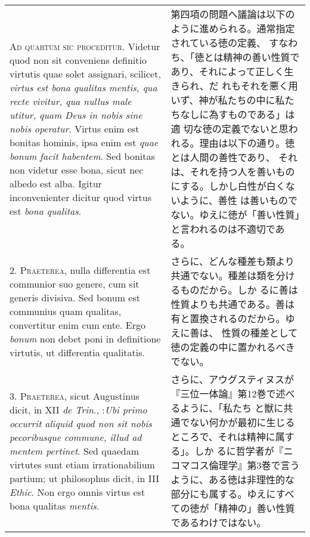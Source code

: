 \documentclass[10pt]{jsarticle}
\begin{document}
\begin{longtable}{p{21em}p{21em}}
{\scshape Ad quartum sic proceditur}. Videtur quod non sit conveniens
definitio virtutis quae solet assignari, scilicet, {\itshape virtus
est bona qualitas mentis, qua recte vivitur, qua nullus male utitur,
quam Deus in nobis sine nobis operatur}. Virtus enim est bonitas
hominis, ipsa enim est {\itshape quae bonum facit habentem}. Sed
bonitas non videtur esse bona, sicut nec albedo est alba. Igitur
inconvenienter dicitur quod virtus est {\itshape bona qualitas}.

&

第四項の問題へ議論は以下のように進められる。通常指定されている徳の定義、
すなわち、「徳とは精神の善い性質であり、それによって正しく生きられ、だ
れもそれを悪く用いず、神が私たちの中に私たちなしに為すものである」は適
切な徳の定義でないと思われる。理由は以下の通り。徳とは人間の善性であり、
それは、それを持つ人を善いものにする。しかし白性が白くないように、善性
は善いものでない。ゆえに徳が「善い性質」と言われるのは不適切である。



\\



2. {\scshape Praeterea}, nulla differentia est communior suo genere,
cum sit generis divisiva. Sed bonum est communius quam qualitas,
convertitur enim cum ente. Ergo {\itshape bonum} non debet poni in
definitione virtutis, ut differentia qualitatis.


&

さらに、どんな種差も類より共通でない。種差は類を分けるものだから。しか
るに善は性質よりも共通である。善は有と置換されるのだから。ゆえに善は、
性質の種差として徳の定義の中に置かれるべきでない。

\\



3. {\scshape Praeterea}, sicut Augustinus dicit, in XII {\itshape de
Trin}., :{\itshape Ubi primo occurrit aliquid quod non sit nobis
pecoribusque commune, illud ad mentem pertinet}. Sed quaedam virtutes
sunt etiam irrationabilium partium; ut philosophus dicit, in III
{\itshape Ethic}. Non ergo omnis virtus est bona qualitas {\itshape
mentis}.

&

さらに、アウグスティヌスが『三位一体論』第12巻で述べるように、「私たち
と獣に共通でない何かが最初に生じるところで、それは精神に属する」。しか
るに哲学者が『ニコマコス倫理学』第3巻で言うように、ある徳は非理性的な
部分にも属する。ゆえにすべての徳が「精神の」善い性質であるわけではない。


\end{longtable}
\end{document}
